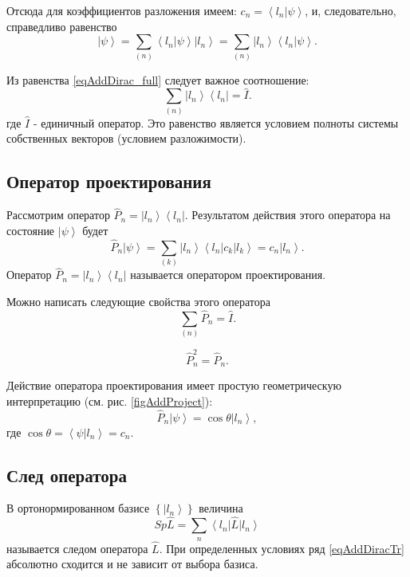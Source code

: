 Отсюда для коэффициентов разложения имеем:  
$c_n = \left< l_n \right| \left. \psi \right>$, и, следовательно,
справедливо равенство 
\begin{equation}  
\left| \psi \right> = \sum_{(n)} \left< l_n \right| \left. \psi
\right> \left| l_n \right> = 
\sum_{(n)} \left| l_n \right> \left< l_n \right| \left. \psi
\right>.
\label{eqAddDirac_full}
\end{equation}  

Из равенства \ref{eqAddDirac_full} следует важное соотношение:
\begin{equation}  
\sum_{(n)} \left| l_n \right> \left< l_n \right| = \hat{I}.
\label{eqAddDiracI}
\end{equation}  
где $\hat{I}$ -  единичный оператор. Это равенство является условием
полноты системы собственных векторов (условием разложимости). 

\subsection{Оператор проектирования}
\label{AddDiracProjector}

Рассмотрим оператор \(\hat{P}_n = \left| l_n \right> \left< l_n
\right|\). 
Результатом действия этого оператора на состояние 
\(\left| \psi \right>\) будет
\begin{equation}
\hat{P}_n \left| \psi \right> = \sum_{(k)} \left| l_n \right> \left<
l_n \right| c_k \left| l_k \right> = c_n \left| l_n \right>.
\label{eqDiracProektor}
\end{equation}
Оператор \(\hat{P}_n = \left| l_n \right> \left< l_n \right|\) называется
оператором проектирования.

Можно написать следующие свойства этого оператора
\begin{equation}  
\sum_{(n)} \hat{P}_n = \hat{I}.
\end{equation}  

\begin{equation}  
\hat{P}_n^2 = \hat{P}_n.
\end{equation}  


Действие оператора проектирования имеет простую геометрическую
интерпретацию  (см. рис. \ref{figAddProject}):
\[
\hat{P}_n\left|\psi\right> = \cos{\theta} \left|l_n\right>,
\]
где $\cos{\theta} = \left<\psi|l_n\right> = c_n$. 

\subsection{След оператора}
\label{AddDiracTrace}
В ортонормированном базисе \(\left\{\left|l_n\right>\right\}\) 
величина 
\begin{equation}  
Sp \hat{L} = \sum_n \left<l_n\right| \hat{L} \left|l_n\right>
\label{eqAddDiracTr}
\end{equation}  
называется следом оператора \(\hat{L}\). При определенных условиях
\cite{bTraceClassOperatorAdd1} ряд \ref{eqAddDiracTr}
абсолютно сходится и не зависит от выбора базиса.


